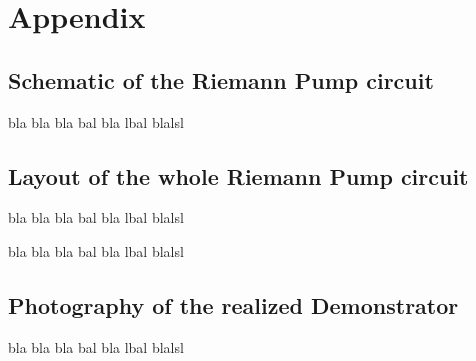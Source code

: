 \renewcommand*\thechapter{}
\renewcommand*\thesection{\Alph{section}}
\chapter*{Appendix}

\section{Schematic of the Riemann Pump circuit}
bla bla bla bal bla lbal blalsl

\newpage
\section{Layout of the whole Riemann Pump circuit}

bla bla bla bal bla lbal blalsl

bla bla bla bal bla lbal blalsl

\newpage
\section{Photography of the realized Demonstrator}

bla bla bla bal bla lbal blalsl